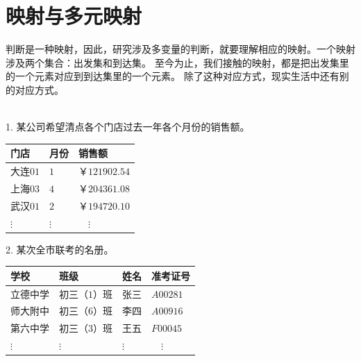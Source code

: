 \documentclass[12pt,UTF8,fontset=none]{ctexbook}
\begin{document}
\section{映射与多元映射}
判断是一种映射，因此，研究涉及多变量的判断，就要理解相应的映射。一个映射涉及两个集合：出发集和到达集。
至今为止，我们接触的映射，都是把出发集里的一个元素对应到到达集里的一个元素。
除了这种对应方式，现实生活中还有别的对应方式。
\begin{ex}
    \mbox{}\\
    1. 某公司希望清点各个门店过去一年各个月份的销售额。
    \begin{center}
        \begin{tabular}{| p{4em}<{\centering} | p{2em}<{\centering} | p{6em}<{\centering} |}
            \hline
            门店 & 月份 & 销售额 \\ [0.5ex] 
            \hline
            大连$01$ & $1$ & ￥$121902.54$ \\  
            \hline
            上海$03$ & $4$ & ￥$204361.08$ \\  
            \hline
            武汉$01$ & $2$ & ￥$194720.10$ \\  
            \hline
            $\vdots$ & $\vdots$ & $\quad\vdots$ \\   
            \hline
        \end{tabular}
    \end{center}
    2. 某次全市联考的名册。
    \begin{center}
        \begin{tabular}{| p{4em}<{\centering} | p{6em}<{\centering} | p{3em}<{\centering} | p{4em}<{\centering} |}
            \hline
            学校 & 班级 & 姓名 & 准考证号 \\ [0.5ex] 
            \hline
            立德中学 & 初三（$1$）班 & 张三 & $A00281$ \\  
            \hline
            师大附中 & 初三（$6$）班 & 李四 & $A00916$ \\  
            \hline
            第六中学 & 初三（$3$）班 & 王五 & $F00045$ \\  
            \hline
            $\vdots$ & $\vdots$& $\vdots$ & $\quad\vdots$ \\   
            \hline
        \end{tabular}
    \end{center}
\end{ex}
\end{document}
